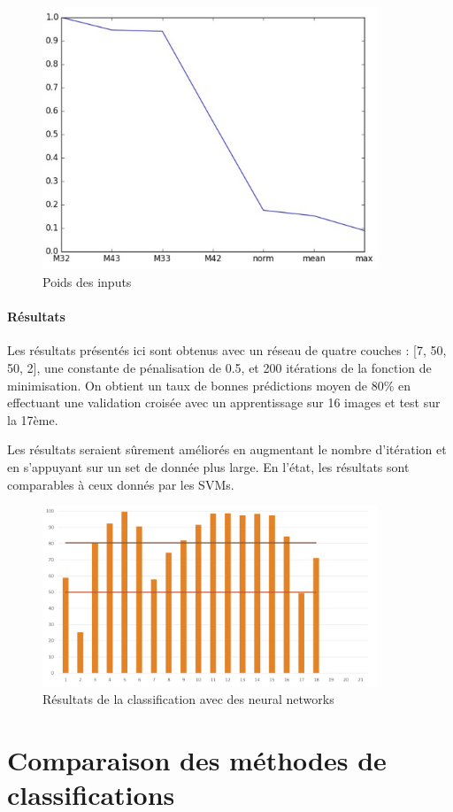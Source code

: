 \documentclass[a4paper,10pt]{report}
\begin{document}
\begin{figure}[htbp]
  \caption{Poids des inputs}
  \centering
  \includegraphics[width=10cm]{input_weight_nn.png}
\end{figure}

\paragraph{Résultats}
Les résultats présentés ici sont obtenus avec un réseau de quatre couches : [7, 50, 50, 2], une constante de pénalisation de 0.5, et 200 itérations de la fonction de minimisation.
On obtient un taux de bonnes prédictions moyen de 80\% en effectuant une validation croisée avec un apprentissage sur 16 images et test sur la 17ème. 

Les résultats seraient sûrement améliorés en augmentant le nombre d'itération et en s'appuyant sur un set de donnée plus large. En l'état, les résultats sont comparables à ceux donnés par les SVMs.
\begin{figure}[htbp]
  \caption{Résultats de la classification avec des neural networks}
  \centering
  \includegraphics[width=10cm]{nn_results.png}
\end{figure}

\section{Comparaison des méthodes de classifications}
\end{document}
